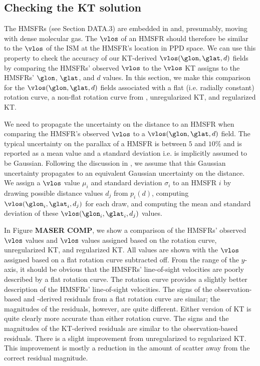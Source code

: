 \subsection{Checking the KT solution}
\label{sec:KT-validation}
The \Reid{} HMSFRs (see Section DATA.3) are embedded in and, presumably, moving with dense molecular gas.
The $\vlos$ of an HMSFR should therefore be similar to the $\vlos$ of the ISM at the HMSFR's location in PPD space.
We can use this property to check the accuracy of our KT-derived $\vlos(\glon, \glat, d)$ fields by comparing the HMSFRs' observed $\vlos$ to the $\vlos$ KT assigns to the HMSFRs' $\glon$, $\glat$, and $d$ values. 
In this section, we make this comparison for the $\vlos(\glon, \glat, d)$ fields associated with a flat (i.e. radially constant) rotation curve, a non-flat rotation curve from \citet{Clemens}, unregularized KT, and regularized KT. 

We need to propagate the uncertainty on the distance to an HMSFR when comparing the HMSFR's observed $\vlos$ to a $\vlos(\glon, \glat, d)$ field.
The typical uncertainty on the parallax of a \Reid{} HMSFR is between $5$ and $10\%$ and is reported as a mean value and a standard deviation i.e. is implicitly assumed to be Gaussian. 
Following the discussion in \citet{Bovy2009}, we assume that this Gaussian uncertainty propagates to an equivalent Gaussian uncertainty on the distance.
We assign a $\vlos$ value $\mu_{i}$ and standard deviation $\sigma_{i}$ to an HMSFR $i$ by drawing possible distance values $d_j$ from $p_i(d)$, computing $\vlos(\glon_{i}, \glat_{i}, d_j)$ for each draw, and computing the mean and standard deviation of these $\vlos(\glon_{i}, \glat_{i}, d_j)$ values. 

In Figure {\bf MASER COMP}, we show a comparison of the HMSFRs' observed $\vlos$ values and $\vlos$ values assigned based on the \citet{Clemens} rotation curve, unregularized KT, and regularized KT.
All values are shown with the $\vlos$ assigned based on a flat rotation curve subtracted off.
From the range of the $y$-axis, it should be obvious that the HMSFRs' line-of-sight velocities are  poorly described by a flat rotation curve.
The \citet{Clemens} rotation curve provides a slightly better description of the HMSFRs' line-of-sight velocities.
The signs of the observation-based and \citet{Clemens}-derived residuals from a flat rotation curve are similar; the magnitudes of the residuals, however, are quite different.
Either version of KT is quite clearly more accurate than either rotation curve.
The signs and the magnitudes of the KT-derived residuals are similar to the observation-based residuals.
There is a slight improvement from unregularized to regularized KT.
This improvement is mostly a reduction in the amount of scatter away from the correct residual magnitude. 

